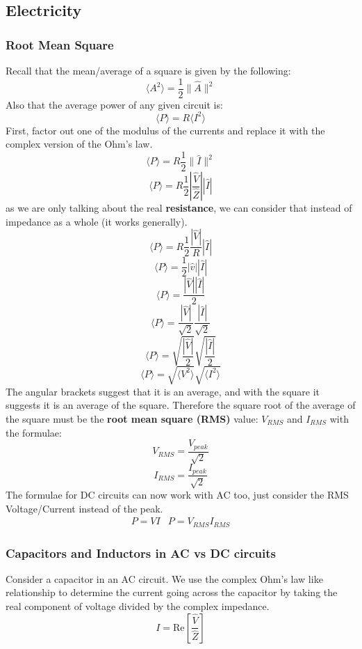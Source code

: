 \documentclass[10pt]{report}
\begin{document}
{{\subsection{Electricity}
\subsubsection{Root Mean Square}
\par{Recall that the mean/average of a square is given by the following: \[
		\langle A^{2}\rangle=\frac{1}{2}\|\hat{A}\|^{2}
\] Also that the average power of any given circuit is: \[
\langle P\rangle=R\langle I^{2}\rangle
\] First, factor out one of the modulus of the currents and replace it with the complex version of the Ohm's law. \[
\langle P\rangle=R\frac{1}{2}\|\hat{I}\|^{2}
\] \[
\langle P\rangle=R\frac{1}{2}\left|\frac{\hat{V}}{\hat{Z}}\right|\left|\hat{I}\right|
\] as we are only talking about the real \textbf{resistance}, we can consider that instead of impedance as a whole (it works generally). \[
\langle P\rangle=R\frac{1}{2}\frac{\left|\hat{V}\right|}{R}\left|\hat{I}\right|
\] \[
\langle P\rangle=\frac{1}{2}\left|\hat{v}\right|\left|\hat{I}\right|
\] \[
\langle P\rangle=\frac{\left|\hat{V}\right|\left|\hat{I}\right|}{2}
\] \[
\langle P\rangle=\frac{\left|\hat{V}\right|}{\sqrt{2}}\frac{\left|\hat{I}\right|}{\sqrt{2}}
\]\[
\langle P\rangle=\sqrt{\frac{\left|\hat{V}\right|}{2}}\sqrt{\frac{\left|\hat{I}\right|}{2}}
\] \[
\langle P\rangle=\sqrt{\langle V^{2}\rangle}\sqrt{\langle I^{2}\rangle}
\] 
The angular brackets suggest that it is an average, and with the square it suggests it is an average of the square. Therefore the square root of the average of the square must be the \textbf{root mean square (RMS)} value: $V_{RMS}$ and $I_{RMS}$ with the formulae: \[
	V_{RMS}=\frac{V_{peak}}{\sqrt{2}}
\] \[
	I_{RMS}=\frac{I_{peak}}{\sqrt{2}}
\] The formulae for DC circuits can now work with AC too, just consider the RMS Voltage/Current instead of the peak. 
\[
\begin{matrix}
	P=VI & P=V_{RMS}I_{RMS}
\end{matrix}
\] }
\subsubsection{Capacitors and Inductors in AC vs DC circuits}
\par{Consider a capacitor in an AC circuit. We use the complex Ohm's law like relationship to determine the current going across the capacitor by taking the real component of voltage divided by the complex impedance. \[
		I=\mathrm{Re}\left[\frac{\hat{V}}{\hat{Z}}\right]
\] 

}}}
\end{document}
